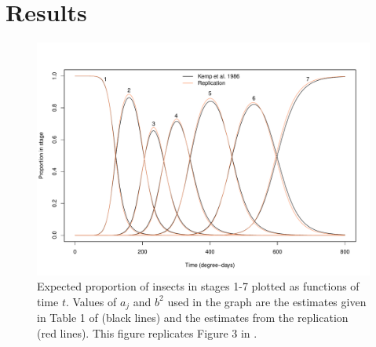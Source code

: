\section{Results}
\begin{figure}
  \centering
  \includegraphics[width=\textwidth]{../figures/dennis_fig3.pdf}
  \caption{Expected proportion of insects in stages 1-7 plotted as functions of time $t$. Values of $a_j$ and $b^2$ used in the graph are the estimates given in Table 1 of \citep{kemp1986stochastic} (black lines) and the estimates from the replication (red lines). This figure replicates Figure 3 in \citep{dennis1986stochastic}.}
  \label{fig:fig2}
\end{figure}